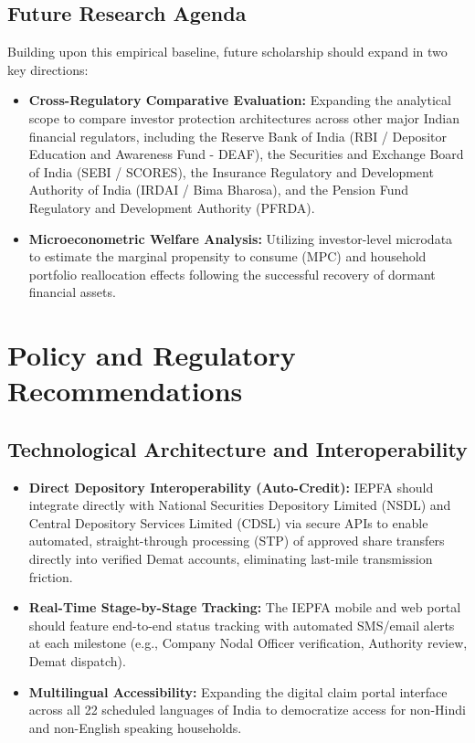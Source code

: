 \documentclass[openany]{book}
\begin{document}
\section{Future Research Agenda}
Building upon this empirical baseline, future scholarship should expand in two key directions:
\begin{itemize}
    \item \textbf{Cross-Regulatory Comparative Evaluation:} Expanding the analytical scope to compare investor protection architectures across other major Indian financial regulators, including the Reserve Bank of India (RBI / Depositor Education and Awareness Fund - DEAF), the Securities and Exchange Board of India (SEBI / SCORES), the Insurance Regulatory and Development Authority of India (IRDAI / Bima Bharosa), and the Pension Fund Regulatory and Development Authority (PFRDA).
    \item \textbf{Microeconometric Welfare Analysis:} Utilizing investor-level microdata to estimate the marginal propensity to consume (MPC) and household portfolio reallocation effects following the successful recovery of dormant financial assets.
\end{itemize}

\chapter{Policy and Regulatory Recommendations}

\section{Technological Architecture and Interoperability}
\begin{itemize}
    \item \textbf{Direct Depository Interoperability (Auto-Credit):} IEPFA should integrate directly with National Securities Depository Limited (NSDL) and Central Depository Services Limited (CDSL) via secure APIs to enable automated, straight-through processing (STP) of approved share transfers directly into verified Demat accounts, eliminating last-mile transmission friction.
    \item \textbf{Real-Time Stage-by-Stage Tracking:} The IEPFA mobile and web portal should feature end-to-end status tracking with automated SMS/email alerts at each milestone (e.g., Company Nodal Officer verification, Authority review, Demat dispatch).
    \item \textbf{Multilingual Accessibility:} Expanding the digital claim portal interface across all 22 scheduled languages of India to democratize access for non-Hindi and non-English speaking households.
\end{itemize}
\end{document}
